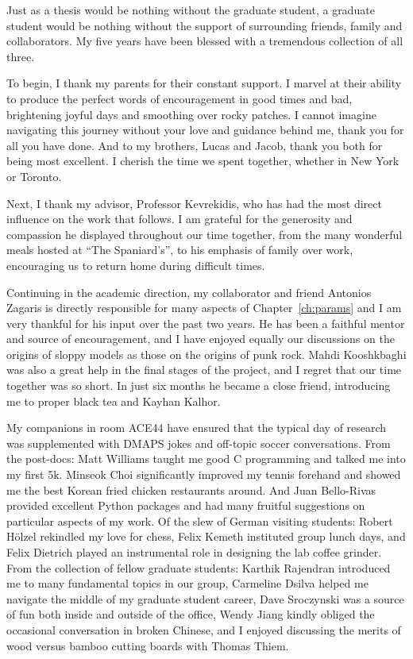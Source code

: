 
Just as a thesis would be nothing without the graduate student, a graduate student would be nothing without the support of surrounding friends, family and collaborators. My five years have been blessed with a tremendous collection of all three.

To begin, I thank my parents for their constant support. I marvel at their ability to produce the perfect words of encouragement in good times and bad, brightening joyful days and smoothing over rocky patches. I cannot imagine navigating this journey without your love and guidance behind me, thank you for all you have done. And to my brothers, Lucas and Jacob, thank you both for being most excellent. I cherish the time we spent together, whether in New York or Toronto.

Next, I thank my advisor, Professor Kevrekidis, who has had the most direct influence on the work that follows. I am grateful for the generosity and compassion he displayed throughout our time together, from the many wonderful meals hosted at ``The Spaniard's'', to his emphasis of family over work, encouraging us to return home during difficult times.

Continuing in the academic direction, my collaborator and friend Antonios Zagaris is directly responsible for many aspects of Chapter~\ref{ch:params} and I am very thankful for his input over the past two years. He has been a faithful mentor and source of encouragement, and I have enjoyed equally our discussions on the origins of sloppy models as those on the origins of punk rock. Mahdi Kooshkbaghi was also a great help in the final stages of the project, and I regret that our time together was so short. In just six months he became a close friend, introducing me to proper black tea and Kayhan Kalhor.

My companions in room ACE44 have ensured that the typical day of research was supplemented with DMAPS jokes and off-topic soccer conversations. From the post-docs: Matt Williams taught me good C programming and talked me into my first 5k. Minseok Choi significantly improved my tennis forehand and showed me the best Korean fried chicken restaurants around. And Juan Bello-Rivas provided excellent Python packages and had many fruitful suggestions on particular aspects of my work. Of the slew of German visiting students: Robert H\"{o}lzel rekindled my love for chess, Felix Kemeth instituted group lunch days, and Felix Dietrich played an instrumental role in designing the lab coffee grinder. From the collection of fellow graduate students: Karthik Rajendran introduced me to many fundamental topics in our group, Carmeline Dsilva helped me navigate the middle of my graduate student career, Dave Sroczynski was a source of fun both inside and outside of the office, Wendy Jiang kindly obliged the occasional conversation in broken Chinese, and I enjoyed discussing the merits of wood versus bamboo cutting boards with Thomas Thiem.

